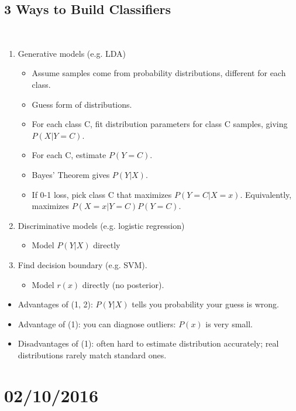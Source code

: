 \documentclass[10pt]{article}
\begin{document}
	\subsection*{3 Ways to Build Classifiers}
	\
		\begin{enumerate}
			\item Generative models (e.g. LDA)
				\begin{itemize}
					\item Assume samples come from probability distributions, different for each class.
					\item Guess form of distributions.
					\item For each class C, fit distribution parameters for class C samples, giving $P(X|Y=C)$.
					\item For each C, estimate $P(Y=C)$.
					\item Bayes' Theorem gives $P(Y|X)$.
					\item If 0-1 loss, pick class C that maximizes $P(Y=C|X=x)$. Equivalently, maximizes $P(X=x|Y=C)P(Y=C)$.
				\end{itemize}
			\item Discriminative models (e.g. logistic regression)
				\begin{itemize}
					\item Model $P(Y|X)$ directly 
				\end{itemize}
			\item Find decision boundary (e.g. SVM).
				\begin{itemize}
					\item Model $r(x)$ directly (no posterior).
				\end{itemize}
		\end{enumerate}
		
		\begin{itemize}
			\item Advantages of (1, 2): $P(Y|X)$ tells you probability your guess is wrong.
			\item Advantage of (1): you can diagnose outliers: $P(x)$ is very small.
			\item Disadvantages of (1): often hard to estimate distribution accurately; real distributions rarely match standard ones.
		\end{itemize}

\newpage
\section*{02/10/2016}
\end{document}
